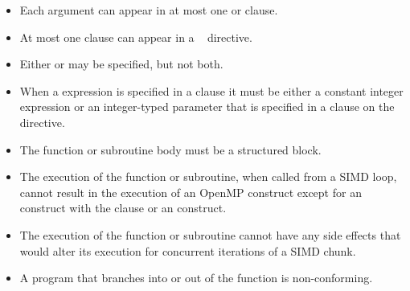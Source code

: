 \restrictions
\begin{itemize}
\item Each argument can appear in at most one  or  clause.
\item At most one  clause can appear in a ~ 
      directive.
\item Either  or  may be specified, but not both.
\item When a  expression is specified in a  clause 
      it must be either a constant integer expression or an integer-typed parameter 
      that is specified in a  clause on the directive.
\item The function or subroutine body must be a structured block.
\item The execution of the function or subroutine, when called from a SIMD loop, 
      cannot result in the execution of an OpenMP construct except for an 
       construct with the  clause or an 
       construct.
\item The execution of the function or subroutine cannot have any side effects 
      that would alter its execution for concurrent iterations of a SIMD chunk.
\item A program that branches into or out of the function is non-conforming.





\end{itemize}
